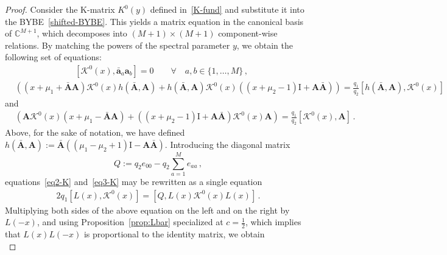 \documentclass[11pt]{article}
\numberwithin{equation}{section}
\newcommand{\oa}{\mathbf{a}}
\newcommand{\oad}{\mathbf{\bar{a}}}
\newcommand{\OA}{\mathbf{A}}
\newcommand{\OAD}{\mathbf{\bar{A}}}
\newcommand{\M}{M}
\newcommand{\ID}{\mathrm{I}}
\newcommand{\Khat}{\mathcal{K}^{0}}
\newcommand{\Khatfund}{K^{0}}
\begin{document}
\begin{proof}
   Consider the K-matrix $\Khatfund(y)$ defined in~\eqref{K-fund} and substitute it into the BYBE~\eqref{shifted-BYBE}. This yields a matrix equation in the canonical basis of $\mathbb{C}^{\M+1}$, which decomposes into $(\M+1) \times (\M+1)$ component-wise relations. By matching the powers of the spectral parameter $y$, we obtain the following set of equations:
\begin{equation}\label{eq1-K}
    \begin{split}
        &\left[\Khat(x),\oad_{a}\oa_{b}\right]=0\qquad \forall \quad a,b\in\{1,\ldots,\M\}\,,
         \end{split}
        \end{equation} 
        \begin{equation}\label{eq2-K}
        \begin{split}
        &        \left((x+\mu_{1}+\OAD \OA)\Khat(x)h(\OAD,\OA)\right.
          +\left.h(\OAD,\OA)\Khat(x)((x+\mu_{2}-1)\ID+\OA\OAD)\right)
        =\frac{q_{1}}{q_2}\left[h(\OAD,\OA),\Khat(x)\right]
        \end{split}
        \end{equation}
        and 
        \begin{equation}\label{eq3-K}
        \begin{split}
        &\left(\OA \Khat(x)(x+\mu_{1}-\OAD\OA)+((x+\mu_{2}-1)\ID+\OA\OAD)\Khat(x)\OA \right)
        =\frac{q_{1}}{q_2}\left[\Khat(x),\OA\right]\,.
    \end{split}
\end{equation}
Above, for the sake of notation, we have defined $h(\OAD,\OA):= \OAD((\mu_{1}-\mu_{2}+1)\ID-\OA\OAD)$. 
Introducing the diagonal matrix
\begin{equation}
    Q:=q_{2}e_{00}-q_{2}\sum_{a=1}^{\M}e_{aa}\,,      \end{equation} equations~\eqref{eq2-K} and~\eqref{eq3-K} may be rewritten as a single equation
\begin{equation}
    \begin{split}
    2q_{1}\left[L(x),\Khat(x)\right]=\left[Q,L(x)\Khat(x)L(x)\right]\,.
    \end{split}
\end{equation}
 Multiplying both sides of the above equation on the left and on the right by $L(-x)$, and using Proposition~\ref{prop:Lbar} specialized at $c=\tfrac{1}{2}$, which implies that $L(x)L(-x)$ is proportional to the identity matrix, we obtain
\begin{equation}\label{eqK-final}

\end{equation}
\end{proof}
\end{document}

